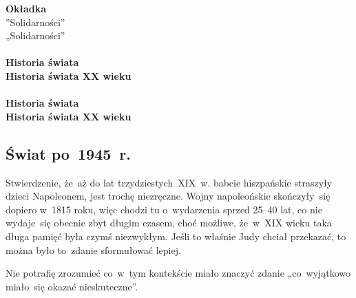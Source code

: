 \documentclass[a4paper,11pt]{article}
\begin{document}
\noindent
\textbf{Okładka} \\
\Jest  ”Solidarności” \\
\Powin „Solidarności” \\
 \\
\Jest  \textbf{Historia świata} \\
\Powin \textbf{Historia świata XX wieku} \\
 \\
\Jest  \textbf{Historia świata} \\
\Powin \textbf{Historia świata XX wieku} \\

\vspace{\spaceTwo}










\subsection{Świat po~1945~r.}

\vspace{\spaceTwo}






\start {} Stwierdzenie, że~aż do lat trzydziestych~XIX~w. babcie
hiszpańskie straszyły dzieci Napoleonem, jest trochę niezręczne. Wojny
napoleońskie skończyły~się dopiero w~1815 roku, więc chodzi tu
o~wydarzenia sprzed 25--40 lat, co nie wydaje~się obecnie zbyt długim
czasem, choć możliwe, że~w~XIX wieku taka długa pamięć była czymś
niezwykłym. Jeśli to właśnie Judy chciał przekazać, to można było
to~zdanie sformułować lepiej.

\vspace{\spaceFour}



\start {} Nie potrafię zrozumieć co~w~tym kontekście miało
znaczyć zdanie „co~wyjątkowo miało~się okazać nieskuteczne”.

\vspace{\spaceFour}
\end{document}
